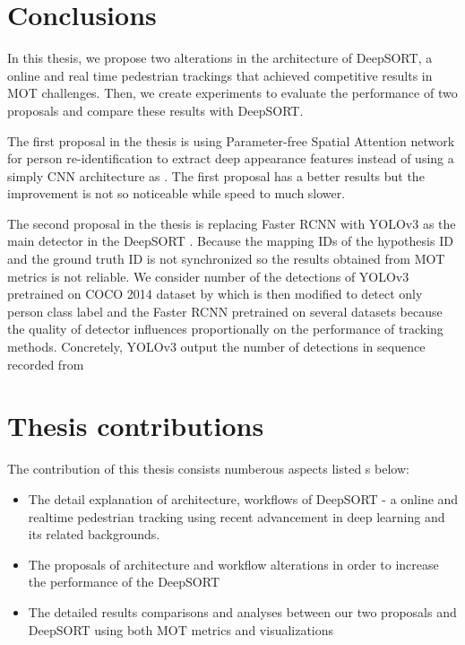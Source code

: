 \section{Conclusions}
\hspace{0.5cm} In this thesis, we propose two alterations in the architecture of DeepSORT\cite{Wojke2017simple}, a online and real time pedestrian trackings that achieved competitive results in MOT challenges. Then, we create experiments to evaluate the performance of two proposals and compare these results with DeepSORT.\par
The first proposal in the thesis is using Parameter-free Spatial Attention network for person re-identification \cite{SA} to extract deep appearance features instead of using a simply CNN architecture as \cite{Wojke2017simple}. The first proposal has a better results but the improvement is not so noticeable while speed to much slower.\par
The second proposal in the thesis is replacing Faster RCNN with YOLOv3 as the main detector in the DeepSORT \cite{Wojke2017simple}. Because the mapping IDs of the hypothesis ID and the ground truth ID is not synchronized so the results obtained from MOT metrics is not reliable. We consider number of the detections of YOLOv3 pretrained on COCO 2014 dataset by \cite{yolov3} which is then modified to detect only person class label  and the Faster RCNN pretrained on several datasets \cite{Wojke2017simple} because the quality of detector influences proportionally on the performance of tracking methods. Concretely, YOLOv3 output the number of detections in sequence recorded from

\section{Thesis contributions}
The contribution of this thesis consists numberous aspects listed s below:
\begin{itemize}
    \item The detail explanation of architecture, workflows of DeepSORT\cite{Wojke2017simple} - a online and realtime pedestrian tracking
     using recent advancement in deep learning and its related backgrounds.
    \item The proposals of architecture and workflow alterations in order to increase the performance of the DeepSORT\cite{Wojke2017simple}
    \item The detailed results comparisons and analyses between our two proposals and DeepSORT\cite{Wojke2017simple} using both MOT metrics\cite{Milan2016MOT16AB} and visualizations
\end{itemize}
